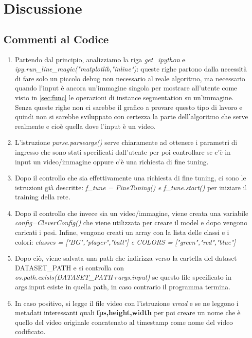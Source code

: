 \chapter{Discussione}
\label{chap:discussion}

\section{Commenti al Codice}
\label{sec:comments}
\begin{enumerate}
\item Partendo dal principio, analizziamo la riga \emph{get\_ipython} e \emph{ipy.run\_line\_magic("matplotlib,"inline")}: queste righe partono dalla necessità di fare solo un piccolo debug non necessario al reale algoritmo, ma necessario quando l'input è ancora un'immagine singola per mostrare all'utente come visto in \ref{sec:func} le operazioni di instance segmentation su un'immagine. Senza queste righe non ci sarebbe il grafico a provare questo tipo di lavoro e quindi non si sarebbe sviluppato con certezza la parte dell'algoritmo che serve realmente e cioè quella dove l'input è un video.\\
\item L'istruzione \emph{parse.parseargs()} serve chiaramente ad ottenere i parametri di ingresso che sono stati specificati dall'utente per poi controllare se c'è in input un video/immagine oppure c'è una richiesta di fine tuning.
\item Dopo il controllo che sia effettivamente una richiesta di fine tuning, ci sono le istruzioni già descritte: \emph{f\_tune = FineTuning() e f\_tune.start()} per iniziare il training della rete.
\item Dopo il controllo che invece sia un video/immagine, viene creata una variabile \emph{config=CleverConfig()} che viene utilizzata per creare il model e dopo vengono caricati i pesi. Infine, vengono creati un array con la lista delle classi e i colori:
\emph{classes = ["BG","player","ball"] e COLORS = ["green","red","blue"]}
\item Dopo ciò, viene salvata una path che indirizza verso la cartella del dataset DATASET\_PATH e si controlla con \emph{os.path.exists(DATASET\_PATH+args.input)} se questo file specificato in args.input esiste in quella path, in caso contrario il programma termina.
\item In caso positivo, si legge il file video con l'istruzione \emph{vread} e se ne leggono i metadati interessanti quali \textbf{fps,height,width} per poi creare un nome che è quello del video originale concatenato al timestamp come nome del video codificato.

\end{enumerate}
